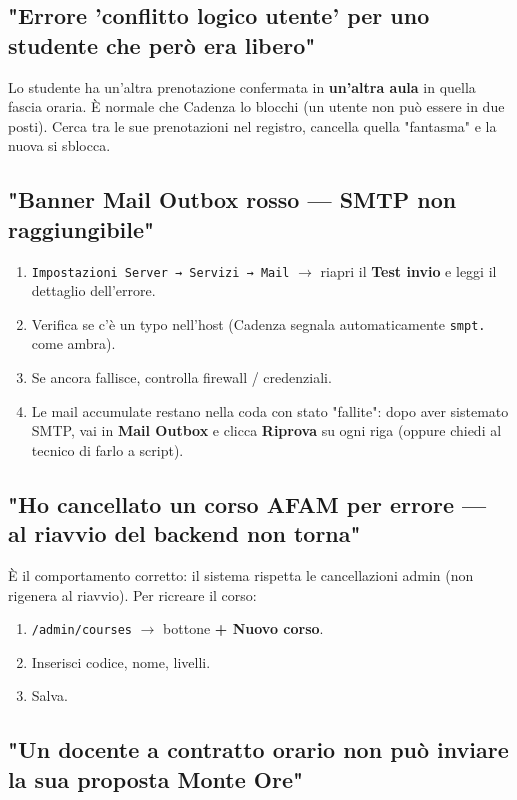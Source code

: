 \documentclass[11pt,a4paper]{article}
\begin{document}
\subsection{"Errore 'conflitto logico utente' per uno studente che però era libero"}


Lo studente ha un'altra prenotazione confermata in \textbf{un'altra aula} in quella fascia oraria. È normale che Cadenza lo blocchi (un utente non può essere in due posti). Cerca tra le sue prenotazioni nel registro, cancella quella "fantasma" e la nuova si sblocca.

\subsection{"Banner Mail Outbox rosso --- SMTP non raggiungibile"}


\begin{enumerate}
  \item \texttt{Impostazioni Server → Servizi → Mail} $\rightarrow$ riapri il \textbf{Test invio} e leggi il dettaglio dell'errore.
  \item Verifica se c'è un typo nell'host (Cadenza segnala automaticamente \texttt{smpt.} come ambra).
  \item Se ancora fallisce, controlla firewall / credenziali.
  \item Le mail accumulate restano nella coda con stato "fallite": dopo aver sistemato SMTP, vai in \textbf{Mail Outbox} e clicca \textbf{Riprova} su ogni riga (oppure chiedi al tecnico di farlo a script).
\end{enumerate}

\subsection{"Ho cancellato un corso AFAM per errore --- al riavvio del backend non torna"}


È il comportamento corretto: il sistema rispetta le cancellazioni admin (non rigenera al riavvio). Per ricreare il corso:

\begin{enumerate}
  \item \texttt{/admin/courses} $\rightarrow$ bottone \textbf{+ Nuovo corso}.
  \item Inserisci codice, nome, livelli.
  \item Salva.
\end{enumerate}

\subsection{"Un docente a contratto orario non può inviare la sua proposta Monte Ore"}
\end{document}
